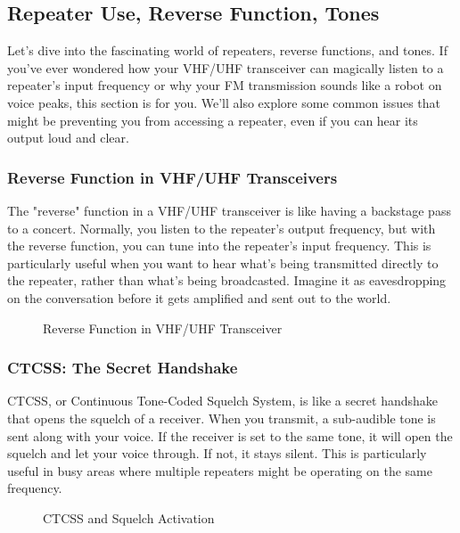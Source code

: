 \subsection{Repeater Use, Reverse Function, Tones}
\label{subsec:repeater-use}

Let's dive into the fascinating world of repeaters, reverse functions, and tones. If you've ever wondered how your VHF/UHF transceiver can magically listen to a repeater's input frequency or why your FM transmission sounds like a robot on voice peaks, this section is for you. We'll also explore some common issues that might be preventing you from accessing a repeater, even if you can hear its output loud and clear.

\subsubsection*{Reverse Function in VHF/UHF Transceivers}
The "reverse" function in a VHF/UHF transceiver is like having a backstage pass to a concert. Normally, you listen to the repeater's output frequency, but with the reverse function, you can tune into the repeater's input frequency. This is particularly useful when you want to hear what's being transmitted directly to the repeater, rather than what's being broadcasted. Imagine it as eavesdropping on the conversation before it gets amplified and sent out to the world.

\begin{figure}[h]
    \centering
    \caption{Reverse Function in VHF/UHF Transceiver}
    \label{fig:reverse-function}
\end{figure}

\subsubsection*{CTCSS: The Secret Handshake}
CTCSS, or Continuous Tone-Coded Squelch System, is like a secret handshake that opens the squelch of a receiver. When you transmit, a sub-audible tone is sent along with your voice. If the receiver is set to the same tone, it will open the squelch and let your voice through. If not, it stays silent. This is particularly useful in busy areas where multiple repeaters might be operating on the same frequency.

\begin{figure}[h]
    \centering
    \caption{CTCSS and Squelch Activation}
    \label{fig:ctcss-squelch}
\end{figure}

